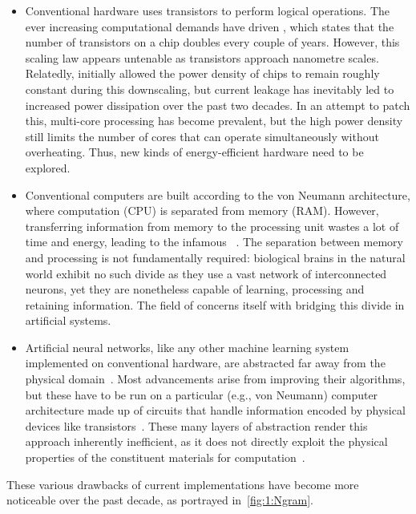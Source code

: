 \begin{itemize} %
	\item Conventional hardware uses transistors to perform logical operations.
	The ever increasing computational demands have driven , which states that the number of transistors on a chip doubles every couple of years.
	However, this scaling law appears untenable as transistors approach nanometre scales.
	Relatedly,  initially allowed the power density of chips to remain roughly constant during this downscaling, but current leakage has inevitably led to increased power dissipation over the past two decades.
	In an attempt to patch this, multi-core processing has become prevalent, but the high power density still limits the number of cores that can operate simultaneously without overheating. %
	Thus, new kinds of energy-efficient hardware need to be explored.
	\item Conventional computers are built according to the von Neumann architecture, where computation (CPU) is separated from memory (RAM).
	However, transferring information from memory to the processing unit wastes a lot of time and energy, leading to the infamous ~\cite{TaskAdaptivePRC}.
	The separation between memory and processing is not fundamentally required: biological brains in the natural world exhibit no such divide as they use a vast network of interconnected neurons, yet they are nonetheless capable of learning, processing and retaining information.
	The field of  concerns itself with bridging this divide in artificial systems.
	\item Artificial neural networks, like any other machine learning system implemented on conventional hardware, are abstracted far away from the physical domain~\cite{RC_ASI}.
	Most advancements arise from improving their algorithms, but these have to be run on a particular (e.g., von Neumann) computer architecture made up of circuits that handle information encoded by physical devices like transistors~\cite{RC_SuperconductingElectronics}.
	These many layers of abstraction render this approach inherently inefficient, as it does not directly exploit the physical properties of the constituent materials for computation~\cite{RC_ASI}.
\end{itemize}
These various drawbacks of current implementations have become more noticeable over the past decade, as portrayed in~\cref{fig:1:Ngram}.
